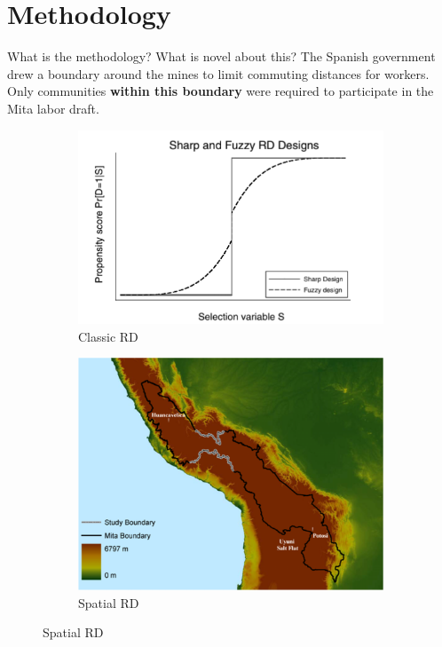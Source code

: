 \documentclass[notes,11pt, aspectratio=169]{beamer}
\begin{document}
\section{Methodology}

\begin{frame}{What is the methodology? What is novel about this?}
The Spanish government drew a boundary around the mines to limit commuting distances for workers. Only communities \textbf{within this boundary} were required to participate in the Mita labor draft.

    \begin{figure}
        \centering
        \begin{subfigure}{0.45\textwidth} %
            \includegraphics[width=\linewidth]{FigFuzzyDesign.png} %
            \caption{Classic RD}
        \end{subfigure}
        \hspace{0.05\textwidth} %
        \begin{subfigure}{0.45\textwidth} %
            \includegraphics[width=\linewidth]{Picture1.png} %
            \caption{Spatial RD}
        \end{subfigure}
    \end{figure}
\end{frame}
\end{document}
